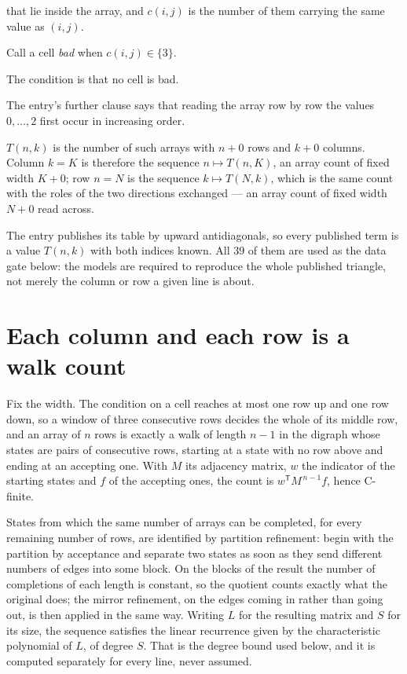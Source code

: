 \documentclass[11pt]{article}
\theoremstyle{definition}
\begin{document}
that lie inside the array, and $c(i,j)$ is the number of them carrying the same value as $(i,j)$.

Call a cell {\itshape bad} when $c(i,j) \in \{3\}$.

The condition is that no cell is bad.

The entry's further clause says that reading the array row by row the values $0,\dots,2$ first occur in increasing order.

$T(n,k)$ is the number of such arrays with $n + 0$ rows and $k + 0$ columns. Column $k = K$ is therefore the sequence $n \mapsto T(n,K)$, an array count of fixed width $K + 0$; row $n = N$ is the sequence $k \mapsto T(N,k)$, which is the same count with the roles of the two directions exchanged --- an array count of fixed width $N + 0$ read across.

The entry publishes its table by upward antidiagonals, so every published term is a value $T(n,k)$ with both indices known. All 39 of them are used as the data gate below: the models are required to reproduce the whole published triangle, not merely the column or row a given line is about.

\section{Each column and each row is a walk count}

Fix the width. The condition on a cell reaches at most one row up and one row down, so a window of three consecutive rows decides the whole of its middle row, and an array of $n$ rows is exactly a walk of length $n-1$ in the digraph whose states are pairs of consecutive rows, starting at a state with no row above and ending at an accepting one. With $M$ its adjacency matrix, $w$ the indicator of the starting states and $f$ of the accepting ones, the count is $w^{\mathsf T}M^{\,n-1}f$, hence C-finite.

States from which the same number of arrays can be completed, for every remaining number of rows, are identified by partition refinement: begin with the partition by acceptance and separate two states as soon as they send different numbers of edges into some block. On the blocks of the result the number of completions of each length is constant, so the quotient counts exactly what the original does; the mirror refinement, on the edges coming in rather than going out, is then applied in the same way. Writing $L$ for the resulting matrix and $S$ for its size, the sequence satisfies the linear recurrence given by the characteristic polynomial of $L$, of degree $S$. That is the degree bound used below, and it is computed separately for every line, never assumed.
\end{document}
